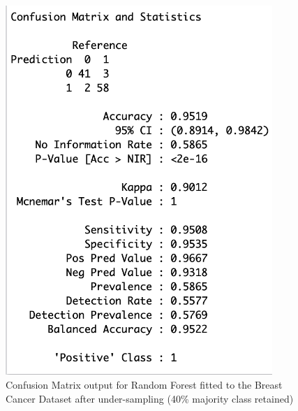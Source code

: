 \begin{figure}[!htbp]
\begin{minipage}{0.45\textwidth}
        \includegraphics[width=0.9\textwidth]{ThesisTemplate/appendix/images/Chapter5Appendix/ConfusionMatrix40/BreastCancer.png}
        \caption{Confusion Matrix output for Random Forest fitted to the Breast Cancer Dataset after under-sampling (40\% majority class retained)}
        \label{fig:my_label}
    \end{minipage}
\end{figure}

